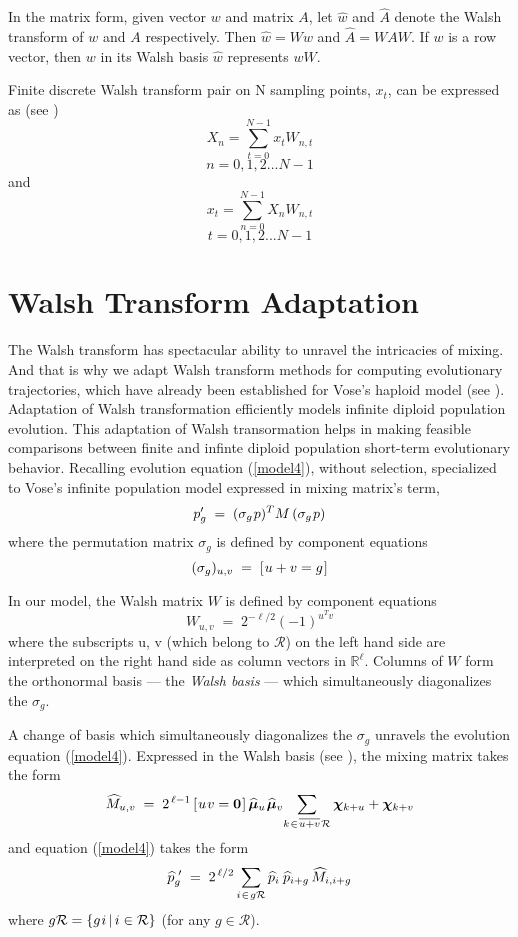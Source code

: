 In the matrix form, given vector $w$ and matrix $A$, let $\widehat{w}$ and
$\widehat{A}$ denote the Walsh transform of $w$ and $A$ respectively. Then $\widehat{w} = Ww$ and
$\widehat{A} = WAW$. If $w$ is a row vector, then $w$ in its Walsh basis $\widehat{w}$ represents $wW$.

Finite discrete Walsh transform pair on N sampling points, $x_t$, can be expressed as (see \cite{Beauchamp1975} )
\begin{equation}
\label{WalshT}
X_n = \sum_{t=0}^{N-1} x_t W_{n,t}
\end{equation}
\[
n = 0, 1, 2...N-1
\]
and
\[
x_t = \sum_{n=0}^{N-1} X_n W_{n,t}
\]
\[
t = 0, 1, 2...N-1
\]

\section{Walsh Transform Adaptation}
The Walsh transform has spectacular ability to unravel the intricacies of mixing. And that is why we adapt Walsh transform methods for computing evolutionary trajectories, which have already been established for Vose's haploid model (see \cite{VoseWright1998}). Adaptation of Walsh transformation efficiently models infinite diploid population evolution. This adaptation of Walsh transormation helps in making feasible comparisons between finite and infinte diploid population short-term evolutionary behavior.
Recalling evolution equation (\ref{model4}), without selection, specialized to Vose's infinite population model expressed in mixing matrix's term,
\[
p_g^\prime \; = \; (\sigma_g \hspace{0.01in} p)^T M \, (\sigma_g \hspace{0.01in} p)
\]
where the permutation matrix $\sigma_g$ is defined by component
equations
\[
(\sigma_g)_{u,v} \; = \; [\hspace{0.01in} u+v = g\hspace{0.01in} ]
\]

In our model, the Walsh matrix $W$
is defined by component equations
\[
W_{u,v} \; = \; 2^{-\ell/2} (-1)^{u^T v}
\]
where the subscripts \nudge u, \nudge v (which belong to $\mathcal{R}$) on the left hand side are interpreted on the right hand side as column vectors in $\mathbb{R}^{\ell}$.
Columns of $W$ form the orthonormal basis --- the
{\em Walsh basis\/} --- which simultaneously diagonalizes the
$\sigma_g$.

A change of basis which simultaneously diagonalizes the $\sigma_g$
unravels the evolution equation (\ref{model4}).  
Expressed in the Walsh basis (see \cite{VoseWright1998}), the mixing matrix
takes the form
\begin{equation}
\label{Mhat}
\widehat{M}_{u,v} \; = \; 2^{\,\ell-1} \,[\hspace{0.01in} u \hspace{0.01in} v = {\bf
    0}\hspace{0.01in}]\, \widehat{\bm{\mu}}_u \hspace{0.01in} \widehat{\bm{\mu}}_v \!  \sum_{k
  \hspace{0.01in} \in \hspace{0.01in} \overline{u+v} \hspace{0.01in} \mathcal{R}} \bm{\chi}_{k + u} +
\bm{\chi}_{k + v}
\end{equation}
and equation (\ref{model4}) takes the form
\begin{equation}
\label{model5}
\widehat{p}_g^{\,\,\prime} \; = \; 2^{\,\ell/2} \sum_{i \hspace{0.01in} \in \hspace{0.01in} g \mathcal{R}}
\widehat{p}_i \, \hspace{0.01in} \widehat{p}_{i+g} \,\widehat{M}_{i,i+g}
\end{equation}
where $g \mathcal{R} = \{g \hspace{0.01in} i \, | \, i \in \mathcal{R} \}$ (for
any $g \in \mathcal{R}$).

